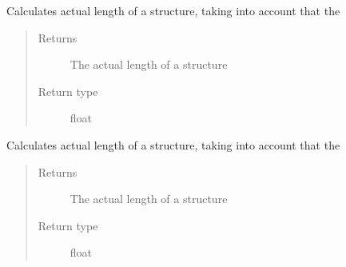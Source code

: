 \documentclass[letterpaper,10pt,english]{sphinxmanual}
\begin{document}
\begin{fulllineitems}
\begin{fulllineitems}
\label{\detokenize{index:calibration_pattern.calibration_pattern.effective_length}}
\sphinxAtStartPar
Calculates actual length of a structure, taking into account that the
\begin{quote}\begin{description}
\item[{Returns}] \leavevmode
\sphinxAtStartPar
The actual length of a structure

\item[{Return type}] \leavevmode
\sphinxAtStartPar
float

\end{description}\end{quote}

\end{fulllineitems}


\begin{fulllineitems}
\label{\detokenize{index:calibration_pattern.calibration_pattern.effective_length_interlocked}}
\sphinxAtStartPar
Calculates actual length of a structure, taking into account that the
\begin{quote}\begin{description}
\item[{Returns}] \leavevmode
\sphinxAtStartPar
The actual length of a structure

\item[{Return type}] \leavevmode
\sphinxAtStartPar
float

\end{description}\end{quote}

\end{fulllineitems}



\end{fulllineitems}
\end{document}
